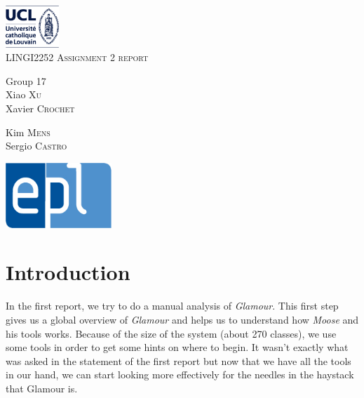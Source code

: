 \documentclass[11pt,a4paper]{article}
\begin{document}
\begin{titlepage}
\begin{center}
\includegraphics[width=0.15\textwidth]{UCL.png}
\vfill
\hrulefill
\\[1.2cm]
\textsc{\LARGE LINGI2252 Assignment 2 report}\\[1.2cm]
\hrulefill
\vfill
\begin{minipage}{0.4\textwidth}
\begin{flushleft} \large
Group 17\\
Xiao \textsc{Xu}\\ Xavier \textsc{Crochet}
\end{flushleft}
\end{minipage}
\begin{minipage}{0.4\textwidth}
\begin{flushright} \large
Kim \textsc{Mens} \\
Sergio \textsc{Castro} \\
\end{flushright}
\end{minipage}
\vfill
\includegraphics[width=0.30\textwidth]{EPL.jpg}\\
\vfill
\end{center}
\end{titlepage}


\tableofcontents
\newpage
\section{Introduction}
In the first report, we try to do a manual analysis of \textit{Glamour}. This first step gives us a global overview of \textit{Glamour} and helps us to understand how \textit{Moose} and his tools works. Because of the size of the system (about 270 classes), we use some tools in order to get some hints on where to begin. It wasn't exactly what was asked in the statement of the first report but now that we have all the tools in our hand, we can start looking more effectively for the needles in the haystack that Glamour is.\\
\end{document}
